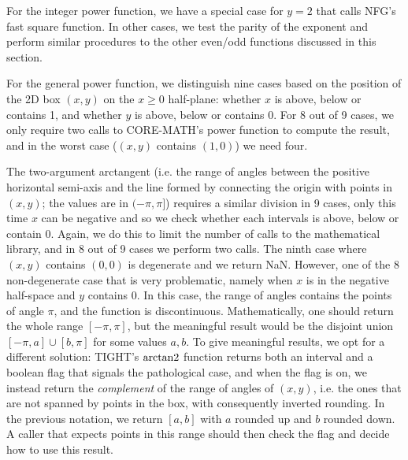 For the integer power function, we have a special case for $y=2$ that calls NFG's fast square function. In other cases, we test the parity of the exponent and perform similar procedures to the other even/odd functions discussed in this section.

For the general power function, we distinguish nine cases based on the position of the 2D box $(x,y)$ on the $x\geq0$ half-plane: whether $x$ is above, below or contains 1, and whether $y$ is above, below or contains 0.
For 8 out of 9 cases, we only require two calls to CORE-MATH's power function to compute the result, and in the worst case ($(x,y)$ contains $(1,0)$) we need four.

The two-argument arctangent (i.e. the range of angles between the positive horizontal semi-axis and the line formed by connecting the origin with points in $(x,y)$; the values are in $(-\pi,\pi]$) requires a similar division in 9 cases, only this time $x$ can be negative and so we check whether each intervals is above, below or contain 0.
Again, we do this to limit the number of calls to the mathematical library, and in 8 out of 9 cases we perform two calls. The ninth case where $(x,y)$ contains $(0,0)$ is degenerate and we return NaN.
However, one of the 8 non-degenerate case that is very problematic, namely when $x$ is in the negative half-space and $y$ contains 0. In this case, the range of angles contains the points of angle $\pi$, and the function is discontinuous. Mathematically, one should return the whole range $[-\pi,\pi]$, but the meaningful result would be the disjoint union $[-\pi, a]\cup[b, \pi]$ for some values $a,b$.
To give meaningful results, we opt for a different solution: TIGHT's $\operatorname{arctan2}$ function returns both an interval and a boolean flag that signals the pathological case, and when the flag is on, we instead return the \emph{complement} of the range of angles of $(x,y)$, i.e. the ones that are not spanned by points in the box, with consequently inverted rounding. In the previous notation, we return $[a,b]$ with $a$ rounded up and $b$ rounded down. A caller that expects points in this range should then check the flag and decide how to use this result.
